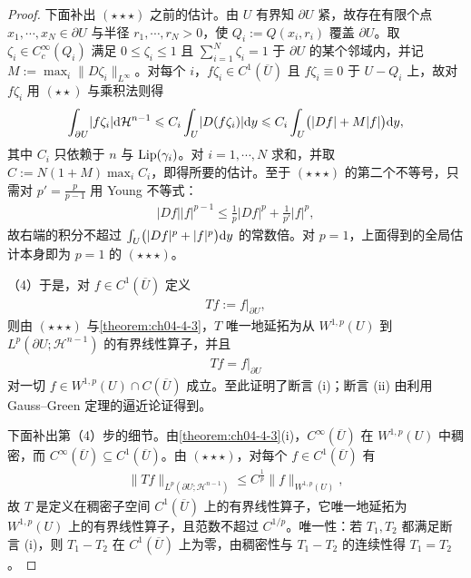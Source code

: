 \documentclass[../../main.tex]{subfiles}%
\begin{document}
\begin{proof}
下面补出 $(\star\star\star)$ 之前的估计。由 $U$ 有界知 $\partial U$ 紧，故存在有限个点 $x_1,\cdots,x_N\in\partial U$ 与半径 $r_1,\cdots,r_N>0$，使 $Q_i:=Q(x_i,r_i)$ 覆盖 $\partial U$。取 $\zeta_i\in C_c^\infty(Q_i)$ 满足 $0\leqslant\zeta_i\leqslant1$ 且 $\sum_{i=1}^N\zeta_i=1$ 于 $\partial U$ 的某个邻域内，并记 $M:=\max_i\lVert D\zeta_i\rVert_{L^\infty}$。对每个 $i$，$f\zeta_i\in C^1(\overline{U})$ 且 $f\zeta_i\equiv0$ 于 $U-Q_i$ 上，故对 $f\zeta_i$ 用 $(\star\star)$ 与乘积法则得
\begin{align*}
\int_{\partial U}\lvert f\zeta_i\rvert\mathrm{d}\mathcal{H}^{n-1}
\leqslant C_i\int_U\lvert D(f\zeta_i)\rvert\mathrm{d} y
\leqslant C_i\int_U\bigl(\lvert Df\rvert+M\lvert f\rvert\bigr)\mathrm{d} y ,
\end{align*}
其中 $C_i$ 只依赖于 $n$ 与 $\operatorname{Lip}(\gamma_i)$。对 $i=1,\cdots,N$ 求和，并取 $C:=N(1+M)\max_iC_i$，即得所要的估计。至于 $(\star\star\star)$ 的第二个不等号，只需对 $p'=\frac{p}{p-1}$ 用 Young 不等式：
\begin{align*}
\lvert Df\rvert\lvert f\rvert^{p-1}\leqslant\frac1p\lvert Df\rvert^p+\frac1{p'}\lvert f\rvert^p ,
\end{align*}
故右端的积分不超过 $\int_U\bigl(\lvert Df\rvert^p+\lvert f\rvert^p\bigr)\mathrm{d} y$ 的常数倍。对 $p=1$，上面得到的全局估计本身即为 $p=1$ 的 $(\star\star\star)$。

（4）于是，对 $f\in C^1(\overline{U})$ 定义
\begin{align*}
Tf:=f|_{\partial U},
\end{align*}
则由 $(\star\star\star)$ 与\cref{theorem:ch04-4-3}，$T$ 唯一地延拓为从 $W^{1,p}(U)$ 到 $L^p(\partial U;\mathcal{H}^{n-1})$ 的有界线性算子，并且 %
\begin{align*}
Tf=f|_{\partial U}
\end{align*}
对一切 $f\in W^{1,p}(U)\cap C(\overline{U})$ 成立。至此证明了断言 (i)；断言 (ii) 由利用 Gauss--Green 定理的逼近论证得到。

下面补出第（4）步的细节。由\cref{theorem:ch04-4-3}(i)，$C^\infty(\overline{U})$ 在 $W^{1,p}(U)$ 中稠密，而 $C^\infty(\overline{U})\subseteq C^1(\overline{U})$。由 $(\star\star\star)$，对每个 $f\in C^1(\overline{U})$ 有%
\begin{align*}
\lVert Tf\rVert_{L^p(\partial U;\mathcal{H}^{n-1})}\leqslant C^{\frac1p}\lVert f\rVert_{W^{1,p}(U)},
\end{align*}
故 $T$ 是定义在稠密子空间 $C^1(\overline{U})$ 上的有界线性算子，它唯一地延拓为 $W^{1,p}(U)$ 上的有界线性算子，且范数不超过 $C^{1/p}$。唯一性：若 $T_1,T_2$ 都满足断言 (i)，则 $T_1-T_2$ 在 $C^1(\overline{U})$ 上为零，由稠密性与 $T_1-T_2$ 的连续性得 $T_1=T_2$。


\end{proof}
\end{document}
